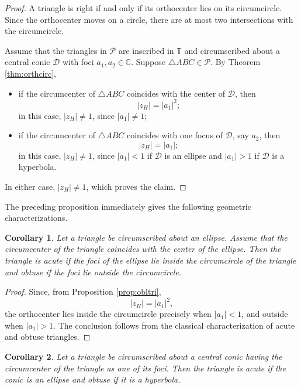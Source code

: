 \documentclass[11pt,reqno]{amsart}
\newtheorem{corollary}{Corollary}[section]
\theoremstyle{definition}
\numberwithin{equation}{section}
\begin{document}
\begin{proof}
A triangle is right if and only if its orthocenter lies on its circumcircle. Since the orthocenter moves on a circle, there are at most two intersections with the circumcircle.

Assume that the triangles in $\mathcal P$ are inscribed in $\mathbb T$ and circumscribed about a central conic $\mathcal D$ with foci $a_1,a_2\in \mathbb C$. Suppose $\triangle ABC \in \mathcal P$. By Theorem \ref{thm:orthcirc},
\begin{itemize}
    \item if the circumcenter of $\triangle ABC$ coincides with the center of $\mathcal D$, then
\[
|z_H|=|a_1|^2;
\]
in this case, $|z_H| \neq 1$, since
$|a_1|\neq 1$;
    \item if the circumcenter of $\triangle ABC$ coincides with one focus of $\mathcal D$, say $a_2$, then 
\[
|z_H|=|a_1|;
\]
in this case, $|z_H| \neq 1$, since $|a_1|<1$ if $\mathcal D$ is an ellipse and $|a_1|>1$ if $\mathcal D$ is a hyperbola.
\end{itemize}
In either case, $|z_H| \neq 1$, which proves the claim.
\end{proof}

The preceding proposition immediately gives the following geometric
characterizations.

\begin{corollary}
Let a triangle be circumscribed about an ellipse. Assume that the circumcenter of the triangle coincides with the center of the ellipse. Then the triangle is acute if the foci of the ellipse lie inside the circumcircle of the triangle and obtuse if the foci lie outside the circumcircle.
\end{corollary}

\begin{proof}
Since, from Proposition \ref{prop:obltri},
\[
|z_H|=|a_1|^2,
\]
the orthocenter lies inside the circumcircle precisely when
$|a_1|<1$, and outside when $|a_1|>1$. The conclusion follows from
the classical characterization of acute and obtuse triangles.
\end{proof}

\begin{corollary}\label{cor:focus}
Let a triangle be circumscribed about a central conic having the circumcenter of the triangle as one of its foci. Then the triangle is acute if the conic is an ellipse and obtuse if it is a hyperbola.
\end{corollary}
\end{document}
